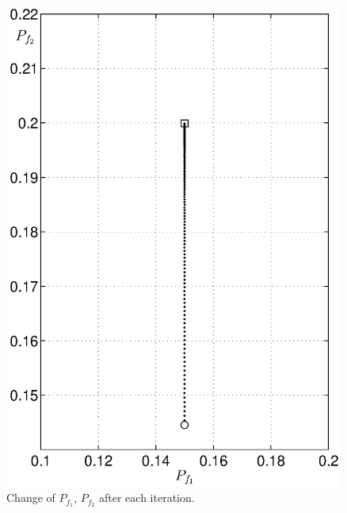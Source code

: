 \begin{figure}[H]
\centering
\includegraphics[width = 12cm, height = 16cm]{2/152pf.eps}
\caption{Change of $P_{f_1}$, $P_{f_2}$ after each iteration.}
\label{fig: 2.3}
\end{figure}
\newpage
